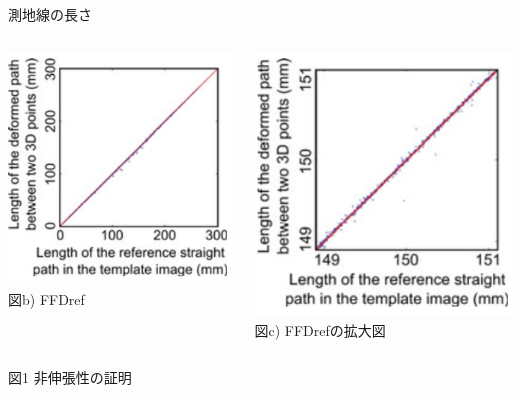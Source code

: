 \documentclass[dvipdfmx]{beamer}
\begin{document}
\begin{frame}{測地線の長さ}
\begin{block}{}
\begin{columns}[onlytextwidth]
\begin{column}[T]{0.32\textwidth}
                \includegraphics[width=1.0\linewidth]{img/fig4b.png}
                図b) FFDref
            \end{column}
            \begin{column}[T]{0.32\linewidth} %
                \centering
                \includegraphics[width=1.0\linewidth]{img/fig4c.png}
                図c) FFDrefの拡大図
            \end{column}
        \end{columns}
        図1 非伸張性の証明
     \end{block}
  \end{frame}
\end{document}
